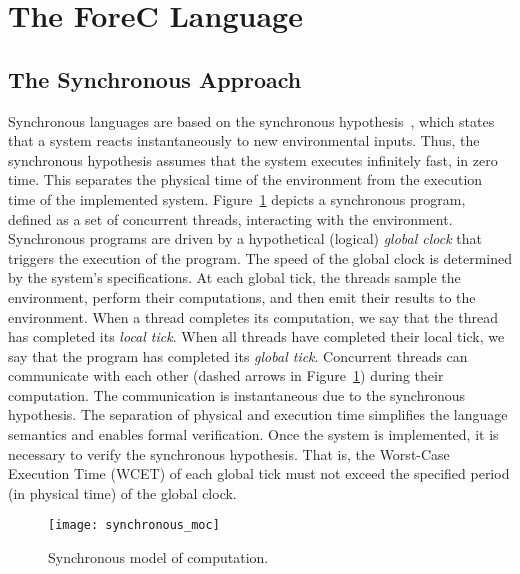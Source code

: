 \section{The ForeC Language}
\label{sec:forecLanguage}


\subsection{The Synchronous Approach}
Synchronous languages are based on the synchronous hypothesis~\cite{timed_synchronous_survey},
which states that a system reacts instantaneously to new environmental
inputs. Thus, the synchronous hypothesis assumes that the system 
executes infinitely fast, in zero time. This separates the physical 
time of the environment from the execution time of the implemented system. 
Figure~\ref{fig:synchronous_moc} depicts a synchronous 
program, defined as a set of concurrent threads, interacting with the 
environment. Synchronous programs are driven by a hypothetical (logical)
\emph{global clock} that triggers the execution of the program. The speed 
of the global clock is determined by the system's specifications. At each
global tick, the threads sample the environment, perform their computations,
and then emit their results to the environment. When a thread completes 
its computation, we say that the thread has completed its \emph{local tick}.
When all threads have completed their local tick, we say that the program
has completed its \emph{global tick}.
Concurrent threads can communicate with each other (dashed 
arrows in Figure~\ref{fig:synchronous_moc}) during their
computation. The communication is instantaneous due to 
the synchronous hypothesis.   
The separation of physical and execution time simplifies 
the language semantics and enables formal verification. Once the 
system is implemented, it is necessary to verify the synchronous 
hypothesis. That is, the Worst-Case Execution Time (WCET) of each 
global tick must not exceed the specified period (in physical time) 
of the global clock.

\begin{figure}
	\centering
	\texttt{[image: synchronous\_moc]}	

	\caption{Synchronous model of computation.}
	\label{fig:synchronous_moc}
\end{figure}

